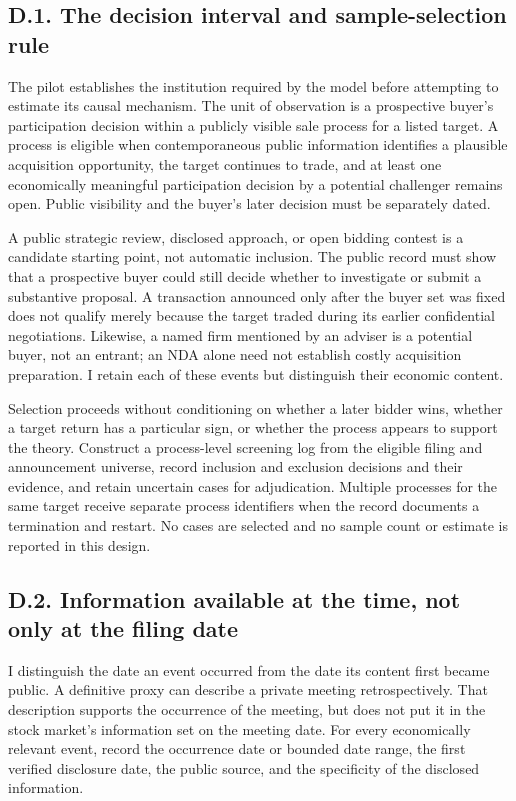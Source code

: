 \documentclass[
  11pt,
]{article}
\begin{document}
\subsection{D.1. The decision interval and sample-selection
rule}\label{oa-d-selection}

The pilot establishes the institution required by the model before
attempting to estimate its causal mechanism. The unit of observation is
a prospective buyer's participation decision within a publicly visible
sale process for a listed target. A process is eligible when
contemporaneous public information identifies a plausible acquisition
opportunity, the target continues to trade, and at least one
economically meaningful participation decision by a potential challenger
remains open. Public visibility and the buyer's later decision must be
separately dated.

A public strategic review, disclosed approach, or open bidding contest
is a candidate starting point, not automatic inclusion. The public
record must show that a prospective buyer could still decide whether to
investigate or submit a substantive proposal. A transaction announced
only after the buyer set was fixed does not qualify merely because the
target traded during its earlier confidential negotiations. Likewise, a
named firm mentioned by an adviser is a potential buyer, not an entrant;
an NDA alone need not establish costly acquisition preparation. I retain
each of these events but distinguish their economic content.

Selection proceeds without conditioning on whether a later bidder wins,
whether a target return has a particular sign, or whether the process
appears to support the theory. Construct a process-level screening log
from the eligible filing and announcement universe, record inclusion and
exclusion decisions and their evidence, and retain uncertain cases for
adjudication. Multiple processes for the same target receive separate
process identifiers when the record documents a termination and restart.
No cases are selected and no sample count or estimate is reported in
this design.

\subsection{D.2. Information available at the time, not only at the
filing date}\label{oa-d-information}

I distinguish the date an event occurred from the date its content first
became public. A definitive proxy can describe a private meeting
retrospectively. That description supports the occurrence of the
meeting, but does not put it in the stock market's information set on
the meeting date. For every economically relevant event, record the
occurrence date or bounded date range, the first verified disclosure
date, the public source, and the specificity of the disclosed
information.
\end{document}
